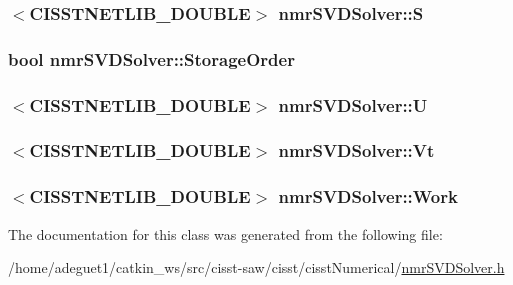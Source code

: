 \hypertarget{classnmr_s_v_d_solver_aca07b1c1cace20d92b7d491341bfb9fe}{
\subsubsection[{S}]{$<$C\-I\-S\-S\-T\-N\-E\-T\-L\-I\-B\-\_\-\-D\-O\-U\-B\-L\-E$>$ nmr\-S\-V\-D\-Solver\-::\-S\hspace{0.3cm}{\ttfamily [protected]}}}\label{classnmr_s_v_d_solver_aca07b1c1cace20d92b7d491341bfb9fe}
\hypertarget{classnmr_s_v_d_solver_a9588844c42329b2d4224d397eebaab5c}{
\subsubsection[{Storage\-Order}]{\setlength{\rightskip}{0pt plus 5cm}bool nmr\-S\-V\-D\-Solver\-::\-Storage\-Order\hspace{0.3cm}{\ttfamily [protected]}}}\label{classnmr_s_v_d_solver_a9588844c42329b2d4224d397eebaab5c}
\hypertarget{classnmr_s_v_d_solver_acc19b0a389707d8cc7c592bbce894b61}{
\subsubsection[{U}]{$<$C\-I\-S\-S\-T\-N\-E\-T\-L\-I\-B\-\_\-\-D\-O\-U\-B\-L\-E$>$ nmr\-S\-V\-D\-Solver\-::\-U\hspace{0.3cm}{\ttfamily [protected]}}}\label{classnmr_s_v_d_solver_acc19b0a389707d8cc7c592bbce894b61}
\hypertarget{classnmr_s_v_d_solver_a095a57197ba4c316b6761b25547b38f0}{
\subsubsection[{Vt}]{$<$C\-I\-S\-S\-T\-N\-E\-T\-L\-I\-B\-\_\-\-D\-O\-U\-B\-L\-E$>$ nmr\-S\-V\-D\-Solver\-::\-Vt\hspace{0.3cm}{\ttfamily [protected]}}}\label{classnmr_s_v_d_solver_a095a57197ba4c316b6761b25547b38f0}
\hypertarget{classnmr_s_v_d_solver_af78f509d3f0c674618f1d40c07c7fdc0}{
\subsubsection[{Work}]{$<$C\-I\-S\-S\-T\-N\-E\-T\-L\-I\-B\-\_\-\-D\-O\-U\-B\-L\-E$>$ nmr\-S\-V\-D\-Solver\-::\-Work\hspace{0.3cm}{\ttfamily [protected]}}}\label{classnmr_s_v_d_solver_af78f509d3f0c674618f1d40c07c7fdc0}


The documentation for this class was generated from the following file\-:\begin{DoxyCompactItemize}
\item 
/home/adeguet1/catkin\-\_\-ws/src/cisst-\/saw/cisst/cisst\-Numerical/\hyperlink{nmr_s_v_d_solver_8h}{nmr\-S\-V\-D\-Solver.\-h}\end{DoxyCompactItemize}
